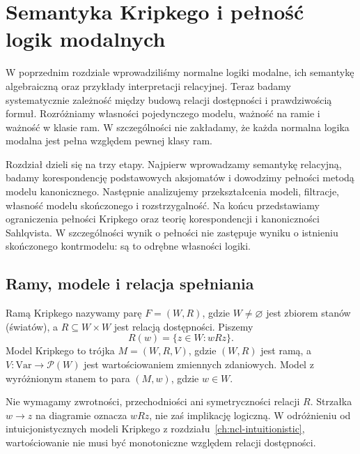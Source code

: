 \chapter{Semantyka Kripkego i pełność logik modalnych}
\label{ch:ncl-modal-kripke}

W poprzednim rozdziale wprowadziliśmy normalne
logiki modalne, ich semantykę algebraiczną
oraz przykłady interpretacji relacyjnej.
Teraz badamy systematycznie zależność między
budową relacji dostępności i prawdziwością formuł.
Rozróżniamy własności pojedynczego modelu,
ważność na ramie i ważność w klasie ram.
W szczególności nie zakładamy, że każda normalna
logika modalna jest pełna względem pewnej klasy ram.

Rozdział dzieli się na trzy etapy. Najpierw
wprowadzamy semantykę relacyjną, badamy
korespondencję podstawowych aksjomatów i dowodzimy
pełności metodą modelu kanonicznego.
Następnie analizujemy przekształcenia modeli,
filtracje, własność modelu skończonego
i rozstrzygalność. Na końcu przedstawiamy
ograniczenia pełności Kripkego oraz teorię
korespondencji i kanoniczności Sahlqvista.
W szczególności wynik o pełności nie zastępuje
wyniku o istnieniu skończonego kontrmodelu:
są to odrębne własności logiki.

\section{Ramy, modele i relacja spełniania}

\begin{definicja}
\label{def:ncl-kripke-frame-model}
Ramą Kripkego nazywamy parę $F=(W,R)$,
gdzie $W\ne\varnothing$ jest zbiorem stanów
(światów), a $R\subseteq W\times W$ jest
relacją dostępności. Piszemy
\[
 R(w)=\{z\in W:wRz\}.
\]
Model Kripkego to trójka $M=(W,R,V)$,
gdzie $(W,R)$ jest ramą, a
$V:\mathrm{Var}\to\mathcal P(W)$ jest
wartościowaniem zmiennych zdaniowych.
Model z wyróżnionym stanem to para $(M,w)$,
gdzie $w\in W$.
\end{definicja}

Nie wymagamy zwrotności, przechodniości
ani symetryczności relacji $R$.
Strzałka $w\to z$ na diagramie oznacza
$wRz$, nie zaś implikację logiczną.
W odróżnieniu od intuicjonistycznych modeli
Kripkego z rozdziału~\ref{ch:ncl-intuitionistic},
wartościowanie nie musi być monotoniczne
względem relacji dostępności.

